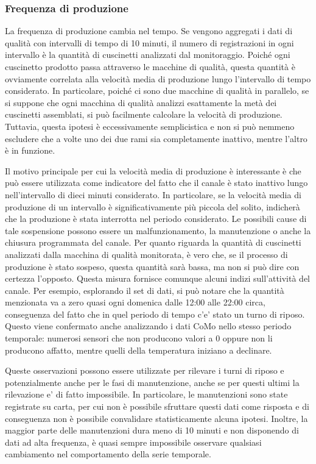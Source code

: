 \subsubsection{Frequenza di produzione}
La frequenza di produzione cambia nel tempo. Se vengono aggregati i dati di qualità con intervalli di tempo di 10 minuti, il numero di registrazioni in ogni intervallo è la quantità di cuscinetti analizzati dal monitoraggio.
Poiché ogni cuscinetto prodotto passa attraverso le macchine di qualità, questa quantità è ovviamente correlata alla velocità media di produzione
lungo l'intervallo di tempo considerato. In particolare, poiché ci sono due macchine di qualità in parallelo, se si suppone che ogni macchina di qualità analizzi esattamente la metà dei cuscinetti assemblati, si può facilmente calcolare la velocità di produzione. Tuttavia, questa ipotesi è eccessivamente semplicistica e non si può nemmeno escludere che a volte uno dei due rami sia completamente inattivo, mentre l'altro è in funzione. 

Il motivo principale per cui la velocità media di produzione è interessante è che può essere utilizzata come indicatore del fatto che il canale è stato inattivo lungo nell'intervallo di dieci minuti considerato. In particolare, se la velocità media di produzione di un intervallo è significativamente più piccola del solito, indicherà che la produzione è stata interrotta nel periodo considerato. Le possibili cause di tale sospensione possono essere un malfunzionamento, la manutenzione o anche la chiusura programmata del canale.
Per quanto riguarda la quantità di cuscinetti analizzati dalla macchina di qualità monitorata, è vero che, se il processo di produzione è stato sospeso, questa quantità sarà bassa, ma non si può dire con certezza l'opposto.
Questa misura fornisce comunque alcuni indizi sull'attività del canale. Per esempio, esplorando il set di dati, si può notare che la quantità menzionata va a zero quasi ogni domenica dalle 12:00 alle 22:00 circa, conseguenza del fatto che in quel periodo di tempo c'e' stato un turno di riposo. Questo viene confermato anche analizzando i dati CoMo nello stesso periodo temporale: numerosi sensori che non producono valori a 0 oppure non li producono affatto, mentre quelli della temperatura iniziano a declinare. 

Queste osservazioni possono essere utilizzate per rilevare i turni di riposo e potenzialmente anche per le fasi di manutenzione, anche se per questi ultimi la rilevazione e' di fatto impossibile. In particolare, le manutenzioni sono state registrate su carta, per cui non è possibile sfruttare questi dati come risposta e di conseguenza non è possibile convalidare statisticamente alcuna ipotesi.
Inoltre, la maggior parte delle manutenzioni dura meno di 10 minuti e
non disponendo di dati ad alta frequenza, è quasi sempre impossibile
osservare qualsiasi cambiamento nel comportamento della serie temporale. 

